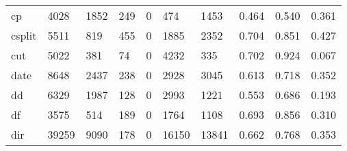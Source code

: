 \begin{longtable}{lp{1.3cm}p{1.3cm}p{1.3cm}p{1.3cm}p{1.3cm}p{1.3cm}p{1.3cm}p{1.3cm}p{1.3cm}}
cp        &                   4028 &                               1852 &                               249 &                                0 &                               474 &                            1453 &                                   0.464 &                                  0.540 &                                0.361 \\
csplit    &                   5511 &                                819 &                               455 &                                0 &                              1885 &                            2352 &                                   0.704 &                                  0.851 &                                0.427 \\
cut       &                   5022 &                                381 &                                74 &                                0 &                              4232 &                             335 &                                   0.702 &                                  0.924 &                                0.067 \\
date      &                   8648 &                               2437 &                               238 &                                0 &                              2928 &                            3045 &                                   0.613 &                                  0.718 &                                0.352 \\
dd        &                   6329 &                               1987 &                               128 &                                0 &                              2993 &                            1221 &                                   0.553 &                                  0.686 &                                0.193 \\
df        &                   3575 &                                514 &                               189 &                                0 &                              1764 &                            1108 &                                   0.693 &                                  0.856 &                                0.310 \\
dir       &                  39259 &                               9090 &                               178 &                                0 &                             16150 &                           13841 &                                   0.662 &                                  0.768 &                                0.353 \\

\end{longtable}
